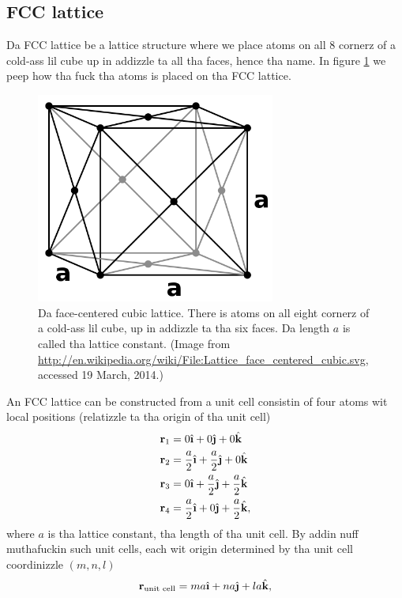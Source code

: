 \subsection{FCC lattice}
Da FCC lattice be a lattice structure where we place atoms on all 8 cornerz of a cold-ass lil cube up in addizzle ta all tha faces, hence tha name. In figure \ref{fig:md_fcc} we peep how tha fuck tha atoms is placed on tha FCC lattice.
\begin{figure}[h!]
\begin{center}
\includegraphics[width=0.7\textwidth, trim=0cm 0cm 0cm 0cm, clip]{MD/figures/fcc.png}
\end{center}
\caption{Da face-centered cubic lattice. There is atoms on all eight cornerz of a cold-ass lil cube, up in addizzle ta tha six faces. Da length $a$ is called tha lattice constant. (Image from \url{http://en.wikipedia.org/wiki/File:Lattice_face_centered_cubic.svg}, accessed 19 March, 2014.)}
\label{fig:md_fcc}
\end{figure}
An FCC lattice can be constructed from a unit cell consistin of four atoms wit local positions (relatizzle ta tha origin of tha unit cell)
\begin{align}
    \vec r_1 &= 0\ihat + 0 \jhat + 0 \khat\\
    \vec r_2 &= \frac{a}{2}\ihat + \frac{a}{2} \jhat + 0 \khat\\
    \vec r_3 &= 0\ihat + \frac{a}{2} \jhat + \frac{a}{2} \khat\\
    \vec r_4 &= \frac{a}{2}\ihat + 0 \jhat + \frac{a}{2} \khat,
\end{align}
where $a$ is tha lattice constant, tha length of tha unit cell. By addin nuff muthafuckin such unit cells, each wit origin determined by tha unit cell coordinizzle $(m,n,l)$
\begin{align}
    \vec r_\text{unit cell} = ma\ihat + na\jhat + la\khat,
\end{align}
